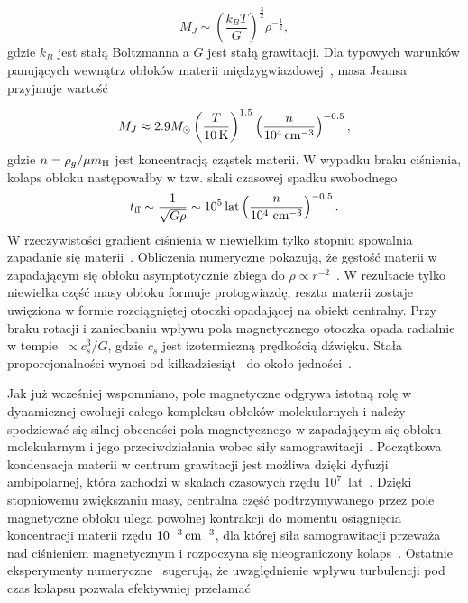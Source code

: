 \begin{equation} M_J \sim
   \left( \frac{k_B T}{G} \right) ^\frac{3}{2} {\rho}^{-\frac{1}{2}},
\end{equation} 
gdzie $k_B$ jest stałą Boltzmanna a $G$ jest stałą grawitacji.
Dla typowych warunków panujących wewnątrz obłoków materii
międzygwiazdowej~\cite{BM89}, masa Jeansa przyjmuje wartość

\begin{equation}
 M_J \approx 2.9 M_{\odot} \left(\frac{T}{10\hbox{$\thinspace\textrm{K}$}}\right)^{1.5} 
 \left(\frac{n}{10^4\hbox{$\thinspace\textrm{cm}$}^{-3}}\right)^{-0.5},
\end{equation}
gdzie $n = \rho_g / \mu \hbox{$m_{\textrm{H}}$}$ jest koncentracją cząstek materii.
W wypadku braku ciśnienia, kolaps obłoku następowałby w tzw. skali czasowej
spadku swobodnego~\cite{Spitzer1978}
\begin{equation}
   t_{\textrm{ff}} \sim \frac{1}{\sqrt{G\rho}} \sim 10^5\hbox{$\thinspace\textrm{lat}$}
   \left(\frac{n}{10^4\thinspace \hbox{$\thinspace\textrm{cm}$}^{-3}}\right)^{-0.5}.
\end{equation}
W rzeczywistości gradient ciśnienia w niewielkim tylko stopniu spowalnia
zapadanie się materii~\cite{T82}. Obliczenia numeryczne pokazują, że gęstość
materii w zapadającym się obłoku asymptotycznie zbiega do $\rho \propto
r^{-2}$~\cite{L69}. W rezultacie tylko niewielka część masy obłoku formuje
protogwiazdę, reszta materii zostaje uwięziona w formie rozciągniętej otoczki
opadającej na obiekt centralny. Przy braku rotacji i zaniedbaniu wpływu pola
magnetycznego otoczka opada radialnie w tempie~$\propto c_s^3 / G$, gdzie
$c_s$ jest izotermiczną prędkością dźwięku. Stała proporcjonalności wynosi od
kilkadziesiąt~\cite{H77} do około jedności~\cite{S77}.
\par Jak już wcześniej wspomniano, pole magnetyczne odgrywa istotną rolę w
dynamicznej ewolucji całego kompleksu obłoków molekularnych i należy spodziewać
się silnej obecności pola magnetycznego w zapadającym się obłoku molekularnym i
jego przeciwdziałania wobec siły samograwitacji~\cite{MC99}. Początkowa
kondensacja materii w centrum grawitacji jest możliwa dzięki dyfuzji
ambipolarnej, która zachodzi w skalach czasowych rzędu $10^7$~lat~\cite{MZGH93}.
Dzięki stopniowemu zwiększaniu masy, centralna część podtrzymywanego przez pole
magnetyczne obłoku ulega powolnej kontrakcji do momentu osiągnięcia koncentracji
materii rzędu $10^{-3}\hbox{$\thinspace\textrm{cm}$}^{-3}$, dla której siła samograwitacji przeważa nad
ciśnieniem magnetycznym i rozpoczyna się nieograniczony kolaps~\cite{BM94, CB00}.
Ostatnie eksperymenty numeryczne~\cite{JHCF13} sugerują, że uwzględnienie
wpływu turbulencji pod czas kolapsu pozwala efektywniej przełamać
